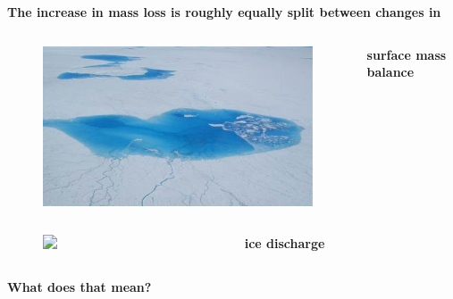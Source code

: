 \documentclass[hide notes,intlimits]{beamer}
\begin{document}
\begin{frame}[plain]
  \textbf{The increase in mass loss is roughly equally split between changes in}
  \begin{columns}[c]
    \begin{column}{.3\linewidth}
      \begin{figure}
        \includegraphics[width=\linewidth]{gris-melt-ponds}
      \end{figure}
    \end{column}
    \begin{column}{.3\linewidth}
      \textbf{surface mass balance}
    \end{column}
  \end{columns}
  \begin{columns}[c]
    \begin{column}{.3\linewidth}
      \begin{figure}
        \includegraphics<1>[width=\linewidth]{storeglacier}
      \end{figure}
    \end{column}
    \begin{column}{.3\linewidth}
      \textbf{ice discharge}
    \end{column}
  \end{columns}
  \bigskip
  \textbf{What does that mean?}
  \note[item]{}
\end{frame}


  {
}
\end{document}

